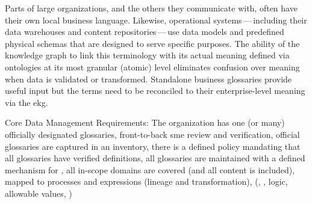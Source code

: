%
%

\ekgmmCapabilitySectionContributionToEnterprise

Parts of large organizations, and the others they communicate with, often have their own local business language.
Likewise, operational systems\,---\,including their data warehouses and content repositories\,---\,use
data models and predefined physical schemas that are designed to serve specific purposes.
The ability of the knowledge graph to link this terminology with its actual meaning defined via ontologies at
its most granular (atomic) level eliminates confusion over meaning when data is validated
or transformed.
Standalone business glossaries provide useful input but the terms need to be reconciled to their
enterprise-level meaning via the \gls{ekg}.

\ekgmmCapabilitySectionDimensions

%
%

\ekgmmCapabilitySectionLevelsOneFive

Core Data Management Requirements: The organization has one (or many) officially designated glossaries,
front-to-back \gls{sme} review and verification, official glossaries are captured in an inventory,
there is a defined policy mandating that all glossaries have verified definitions,
all glossaries are maintained with a defined mechanism for ,
all in-scope domains are covered (and all content is included), mapped to processes and expressions
(lineage and transformation),  (, , logic,
allowable values, )

